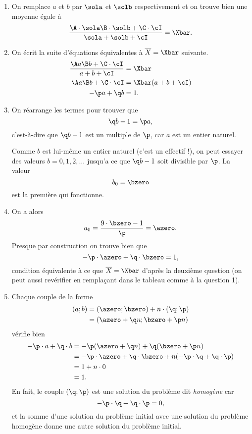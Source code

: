 {
	\begin{enumerate}
		\item
		On remplace $a$ et $b$ par $\sola$ et $\solb$ respectivement et on trouve bien une moyenne égale à
			\[ \dfrac{\A\cdot\sola \B\cdot\solb+\C\cdot\cI}{\sola+\solb+\cI} = \Xbar. \]
		
		\item 
		On écrit la suite d'équations équivalentes à $\overline{X} = \Xbar$ suivante.
			\begin{align*}
				\dfrac{\A a \B b+\C\cdot\cI}{a + b+\cI} &= \Xbar \\
				\A a \B b+\C\cdot\cI &= \Xbar  (a+b+\cI) \\
				 - \p a + \q b &= 1.
			\end{align*}
		
		\item
		On réarrange les termes pour trouver que 
			\[ \q b - 1 = \p a, \]
		c'est-à-dire que $\q b - 1$ est un multiple de $\p$, car $a$ est un entier naturel.
		
		Comme $b$ est lui-même un entier naturel (c'est un effectif !), on peut essayer des valeurs $b=0, 1, 2, \dots$ jusqu'a ce que $\q b -1$ soit divisible par $\p$.
		La valeur
			\[ b_0 = \bzero \]
		est la première qui fonctionne.
		
		\item
		On a alors
			\[ a_0 = \dfrac{9 \cdot \bzero - 1}{\p} = \azero. \]
		Presque par construction on trouve bien que 
			\[ -\p \cdot \azero  + \q \cdot \bzero = 1, \]
		condition équivalente à ce que $\overline{X} = \Xbar$ d'après la deuxième question (on peut aussi revérifier en remplaçant dans le tableau comme à la question 1).
		
		\item
		Chaque couple de la forme
			\begin{align*}
				(a;b) &= (\azero; \bzero) + n \cdot (\q ; \p) \\
					&= (\azero+ \q n ; \bzero + \p n )
			\end{align*}
		vérifie bien
			\begin{align*}
				 - \p \cdot a +  \q \cdot b &= - \p (\azero + \q n ) + \q (\bzero + \p n ) \\
				 							&= -\p \cdot \azero +  \q \cdot \bzero + n (- \p \cdot \q + \q \cdot \p) \\
				 							&= 1 + n \cdot 0 \\
				 							&= 1.
			\end{align*}
		En fait, le couple $(\q; \p)$ est une solution du problème dit \emph{homogène} car
			\[ -\p \cdot \q + \q \cdot \p = 0, \]
		et la somme d'une solution du problème initial avec une solution du problème homogène donne une autre solution du problème initial.
		

\end{enumerate}}
